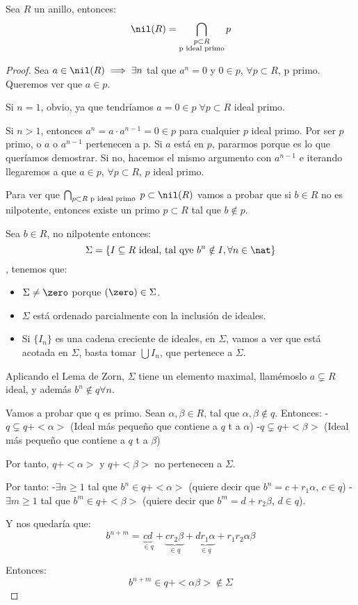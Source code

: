 \begin{prop}
	Sea $R$ un anillo, entonces:
	$$ \nil(R)=\bigcap_{\substack{p\subset R\\\text{p ideal primo}}} p $$

\end{prop}
\begin{proof}

\proofpart{$\subset$}

	Sea $a \in \nil(R) \implies \exists n$ tal que $a^n=0$ y $0 \in p$, $\forall p \subset R$, p primo. Queremos ver que $a \in p$.

	Si $n=1$, obvio, ya que tendríamos $a=0\in p\; \forall p \subset R$ ideal primo.

	Si $n>1$, entonces $a^n = a\cdot a^{n-1}=0 \in p$ para cualquier $p$ ideal primo. Por ser $p$ primo, o $a$ o $a^{n-1}$ pertenecen a p. Si $a$ está en $p$, pararmos porque es lo que queríamos demostrar. Si no, hacemos el mismo argumento con $a^{n-1}$ e iterando llegaremos a que $a \in p$, $\forall p \subset R$, $p$ ideal primo.

\proofpart{$\supset$}

	Para ver que $\bigcap_{p\subset R \text{ p ideal primo }}p \subset \nil(R)$ vamos a probar que si $b \in R$ no es nilpotente, entonces existe un primo $p\subset R$ tal que $b \notin p$.

	Sea $b \in R$, no nilpotente entonces:
	$$\Sigma = \{I \subseteq R \text{ ideal, tal qye }b^n \notin I, \forall n \in \nat\}$$, tenemos que:
	\begin{itemize}
	\item $\Sigma \neq \zero$ porque $(\zero) \in \Sigma$.
	\item $\Sigma$ está ordenado parcialmente con la inclusión de ideales.
	\item Si $\{I_n\}$ es una cadena creciente de ideales, en $\Sigma$, vamos a ver que está acotada en $\Sigma$, basta tomar $\bigcup I_n$, que pertenece a $\Sigma$.
	\end{itemize}

	Aplicando el Lema de Zorn, $\Sigma$ tiene un elemento maximal, llamémoslo $a \subsetneq R$ ideal, y además $b^n \notin q \forall n$.

	Vamos a probar que q es primo. Sean $\alpha, \beta \in R$, tal que $\alpha, \beta \notin q$. Entonces:
	-$q \subsetneq q + <\alpha>$ (Ideal más pequeño que contiene a $q$ t a $\alpha$)
	-$q \subsetneq q + <\beta>$ (Ideal más pequeño que contiene a $q$ t a $\beta$)

	Por tanto, $ q + <\alpha>$ y $q + <\beta>$ no pertenecen a $\Sigma$.

	Por tanto:
	-$\exists n\geq 1$ tal que $b^n \in q+<\alpha>$ (quiere decir que $b^n=c+r_1 \alpha$, $c\in q$)
	-$\exists m\geq 1$ tal que $b^m \in q+<\beta>$ (quiere decir que $b^m=d+r_2 \beta$, $d\in q$).

	Y nos quedaría que:
	$$b^{n+m}=\underbrace{cd}_{\in q}+\underbrace{cr_2\beta}_{\in q}+\underbrace{dr_1\alpha}_{\in q}+r_1r_2\alpha \beta$$

	Entonces:
	$$b^{n+m}\in q+<\alpha \beta> \notin \Sigma$$

\end{proof}

